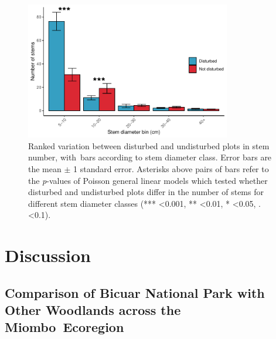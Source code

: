 \documentclass[diversity,article,accept,moreauthors,pdftex]{Definitions/mdpi}
\begin{document}
\begin{figure}[H]
\centering
	\includegraphics[width=0.8\textwidth]{img/degrad_dbh_bin}
	\caption{Ranked variation between disturbed and undisturbed plots in stem number, with~bars according to stem diameter class. Error bars are the mean $\pm$ 1 standard error. Asterisks above pairs of bars refer to the \emph{p}-values of Poisson general linear models which tested whether disturbed and undisturbed plots differ in the number of stems for different stem diameter classes (*** <0.001, ** <0.01, * <0.05, . <0.1).} %
	\label{degrad_dbh_bin}
\end{figure}


\section{Discussion}
\unskip
\subsection{Comparison of Bicuar National Park with Other Woodlands across the Miombo~Ecoregion}
\end{document}
